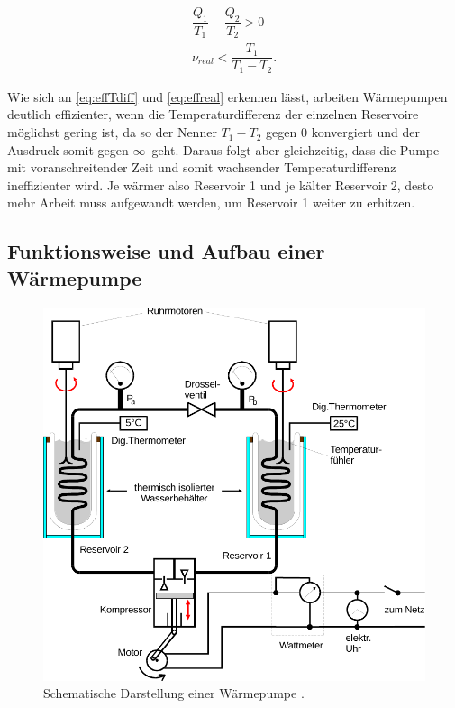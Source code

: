 \begin{align}
    \dfrac{Q_1}{T_1} - \dfrac{Q_2}{T_2} > 0 \\
    ν_{real} < \dfrac{T_1}{T_1-T_2} \text{.} \label{eq:effreal}
\end{align}

Wie sich an \eqref{eq:effTdiff} und \eqref{eq:effreal} erkennen lässt, arbeiten Wärmepumpen deutlich effizienter, wenn die Temperaturdifferenz der einzelnen Reservoire möglichst gering ist, da so der Nenner $T_1-T_2$
gegen $0$ konvergiert und der Ausdruck somit gegen $\infty \,$ geht. Daraus folgt aber gleichzeitig, dass die Pumpe mit voranschreitender Zeit und somit wachsender Temperaturdifferenz ineffizienter wird. Je wärmer also
Reservoir 1 und je kälter Reservoir 2, desto mehr Arbeit muss aufgewandt werden, um Reservoir 1 weiter zu erhitzen.

\subsection{Funktionsweise und Aufbau einer Wärmepumpe}

\begin{figure}
    \centering
    \includegraphics[scale=0.7]{Abb_1.pdf}
    \caption{Schematische Darstellung einer Wärmepumpe \cite{ap02}.} 
    \label{fig:abb1}
\end{figure}

